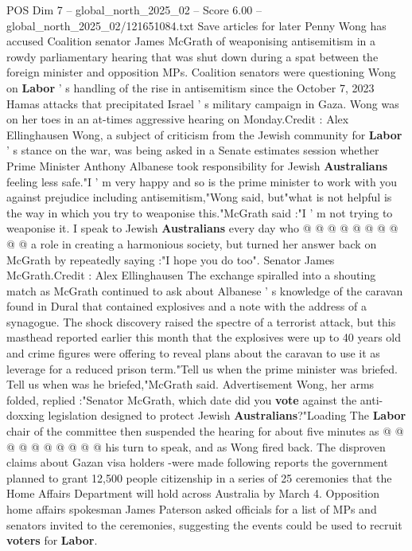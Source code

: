 \begin{textsample}{POS Dim 7 – global\_north\_2025\_02 – Score 6.00 – global\_north\_2025\_02/121651084.txt}  \label{ex:f7_pos_281}
Save articles for later Penny Wong has accused Coalition senator James McGrath of weaponising antisemitism in a rowdy parliamentary hearing that was shut down during a spat between the foreign minister and opposition MPs.
Coalition senators were questioning Wong on \textbf{Labor} ' s handling of the rise in antisemitism since the October 7, 2023 Hamas attacks that precipitated Israel ' s military campaign in Gaza.
Wong was on her toes in an at-times aggressive hearing on Monday.Credit : Alex Ellinghausen Wong, a subject of criticism from the Jewish community for \textbf{Labor} ' s stance on the war, was being asked in a Senate estimates session whether Prime Minister Anthony Albanese took responsibility for Jewish \textbf{Australians} feeling less safe."I ' m very happy and so is the prime minister to work with you against prejudice including antisemitism,"Wong said, but"what is not helpful is the way in which you try to weaponise this."McGrath said :"I ' m not trying to weaponise it.
I speak to Jewish \textbf{Australians} every day who @ @ @ @ @ @ @ @ @ @ a role in creating a harmonious society, but turned her answer back on McGrath by repeatedly saying :"I hope you do too".
Senator James McGrath.Credit : Alex Ellinghausen The exchange spiralled into a shouting match as McGrath continued to ask about Albanese ' s knowledge of the caravan found in Dural that contained explosives and a note with the address of a synagogue.
The shock discovery raised the spectre of a terrorist attack, but this masthead reported earlier this month that the explosives were up to 40 years old and crime figures were offering to reveal plans about the caravan to use it as leverage for a reduced prison term."Tell us when the prime minister was briefed.
Tell us when was he briefed,"McGrath said.
Advertisement Wong, her arms folded, replied :"Senator McGrath, which date did you \textbf{vote} against the anti-doxxing legislation designed to protect Jewish \textbf{Australians}?"Loading The \textbf{Labor} chair of the committee then suspended the hearing for about five minutes as @ @ @ @ @ @ @ @ @ @ his turn to speak, and as Wong fired back.
The disproven claims about Gazan visa holders -were made following reports the government planned to grant 12,500 people citizenship in a series of 25 ceremonies that the Home Affairs Department will hold across Australia by March 4.
Opposition home affairs spokesman James Paterson asked officials for a list of MPs and senators invited to the ceremonies, suggesting the events could be used to recruit \textbf{voters} for \textbf{Labor}.

\end{textsample}
